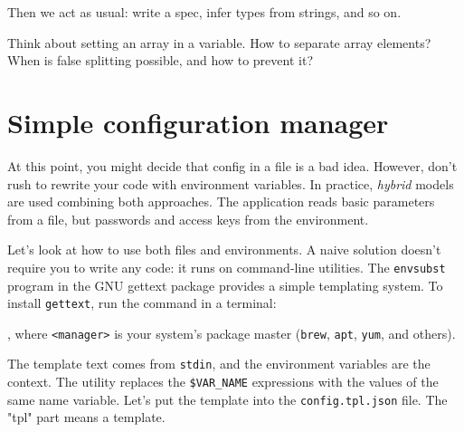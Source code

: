 \fi

\noindent
Then we act as usual: write a spec, infer types from strings, and so on.

Think about setting an array in a variable. How to separate array elements? When is false splitting possible, and how to prevent it?

\section{Simple configuration manager}


At this point, you might decide that config in a file is a bad idea. However, don't rush to rewrite your code with environment variables. In practice, \emph{hybrid} models are used combining both approaches. The application reads basic parameters from a file, but passwords and access keys from the environment.


Let's look at how to use both files and environments. A naive solution doesn't require you to write any code: it runs on command-line utilities. The \verb|envsubst| program in the GNU gettext package provides a simple templating system. To install \verb|gettext|, run the command in a terminal:


\begin{english}
\end{english}

\noindent
, where \verb|<manager>| is your system's package master (\verb|brew|, \verb|apt|, \verb|yum|, and others).


The template text comes from \verb|stdin|, and the environment variables are the context. The utility replaces the \verb|$VAR_NAME| expressions with the values of the same name variable. Let's put the template into the \verb|config.tpl.json| file. The "tpl" part means a template.

\begin{english}
\end{english}

